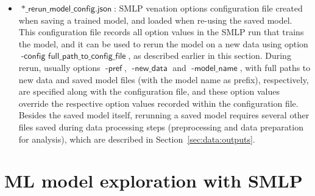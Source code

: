 \documentclass[a4paper,parskip=half]{article} %
\newcommand*\option[1]{\operatorname{\mathsf{#1}}} %
\newcommand*\suffix[1]{\operatorname{\mathsf{#1}}} %
\begin{document}
\begin{itemize}
\item $\suffix{*\_rerun\_model\_config.json}$: SMLP venation options configuration file created when saving 
a trained model, and loaded when re-using the saved model. This configuration file records all option values in the 
SMLP run that trains the model, and it can be used to rerun the model on a new data using option 
$\option{-config\,\,full\_path\_to\_config\_file}$, as described earlier in this section. During rerun, usually
options $\option{-pref}$, $\option{-new\_data}$ and $\option{-model\_name}$, with full paths to new data 
and saved model files (with the model name as prefix), respectively, are specified along with the configuration file, 
and these option values override the respective option values recorded within the configuration file.
Besides the saved model itself, rerunning a saved model requires several other files saved during data processing
steps (preprocessing and data preparation for analysis), which are described in Section~\ref{sec:data:outputs}.  
\end{itemize}


\section{ML model exploration with SMLP}\label{sec:exploration}
\end{document}
